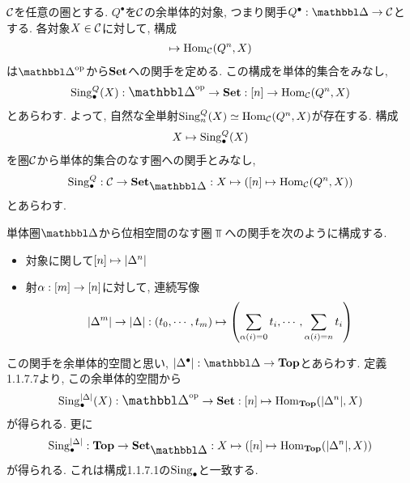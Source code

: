 \documentclass[uplatex, a4paper, 14Q, dvipdfmx]{jsreport}
\begin{document}
\begin{definition}
  $\mathcal{C}$を任意の圏とする. 
  $Q^\bullet$を$\mathcal{C}$の余単体的対象, つまり関手$Q^\bullet: \csim \to \calC$とする. 
  各対象$X \in \mathcal{C}$に対して, 構成
  \begin{align*}
    [n] \mt \Hom_{\calC}(Q^n,X)
  \end{align*}
  は$\simop$から$\mathbf{Set}$への関手を定める. 
  この構成を単体的集合をみなし, 
  \begin{align*}
    \Sing_\bullet^Q(X): \simop \to \cset: [n] \to \Hom_{\calC}(Q^n,X)
  \end{align*}
  とあらわす. 
  よって, 自然な全単射$\mathrm{Sing}_{n}^Q(X) \simeq \mathrm{Hom}_{\mathcal{C}}(Q^n,X)$が存在する. 
  構成
  \begin{align*}
    X \mapsto \mathrm{Sing}_\bullet^Q(X)
  \end{align*}
  を圏$\mathcal{C}$から単体的集合のなす圏への関手とみなし, 
  \begin{align*}
    \Sing_\bullet^Q: \calC \to \sset: X \mt ([n] \mt \Hom_{\calC}(Q^n,X))
  \end{align*}
  とあらわす. 
\end{definition}

\begin{example}
  単体圏$\csim$から位相空間のなす圏$\Top$への関手を次のように構成する. 
  \begin{itemize}
    \item 対象に関して$[n] \mapsto |\Delta^n|$
    \item 射$\alpha: [m] \to [n]$に対して, 連続写像
    \begin{align*}
      |\Delta^m| \to |\Delta|: (t_0,\cdots,t_m) \mapsto \qty(\sum_{\alpha(i)=0}t_i,\cdots,\sum_{\alpha(i)=n}t_i)
    \end{align*}
  \end{itemize}
  この関手を余単体的空間と思い, $|\Delta^\bullet|: \csim \to \Top$とあらわす. 
  定義1.1.7.7より, この余単体的空間から
  \begin{align*}
    \Sing_\bullet^{|\Delta|}(X): \simop \to \cset: [n] \mt \Hom_{\Top}(|\Delta^n|,X)
  \end{align*} 
  が得られる. 
  更に
  \begin{align*}
    \Sing_\bullet^{|\Delta|}: \Top \to \sset: X \mt ([n] \mt \Hom_{\Top}(|\Delta^n|,X))
  \end{align*}
  が得られる. 
  これは構成1.1.7.1の$\mathrm{Sing}_\bullet$と一致する. 
\end{example}
\end{document}

